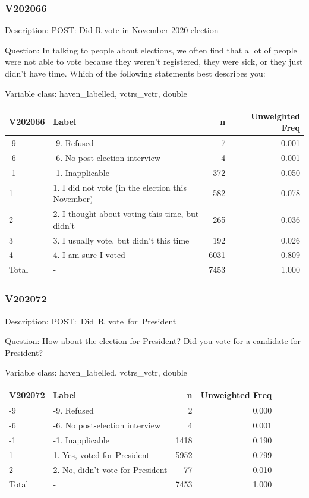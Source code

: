 \documentclass[
]{krantz}
\begin{document}
\hypertarget{v202066}{%
\subsubsection*{V202066}\label{v202066}}


Description: POST: Did R vote in November 2020 election

Question: In talking to people about elections, we often find that a lot of people were not able to vote because they weren't registered, they were sick, or they just didn't have time. Which of the following statements best describes you:

Variable class: haven\_labelled, vctrs\_vctr, double

\begin{tabular}[t]{l|l|r|r}
\hline
V202066 & Label & n & Unweighted Freq\\
\hline
-9 & -9. Refused & 7 & 0.001\\
\hline
-6 & -6. No post-election interview & 4 & 0.001\\
\hline
-1 & -1. Inapplicable & 372 & 0.050\\
\hline
1 & 1. I did not vote (in the election this November) & 582 & 0.078\\
\hline
2 & 2. I thought about voting this time, but didn't & 265 & 0.036\\
\hline
3 & 3. I usually vote, but didn't this time & 192 & 0.026\\
\hline
4 & 4. I am sure I voted & 6031 & 0.809\\
\hline
Total & - & 7453 & 1.000\\
\hline
\end{tabular}

\hypertarget{v202072}{%
\subsubsection*{V202072}\label{v202072}}


Description: POST:~Did~R~vote~for~President

Question: How about the election for President? Did you vote for a candidate for President?

Variable class: haven\_labelled, vctrs\_vctr, double

\begin{tabular}[t]{l|l|r|r}
\hline
V202072 & Label & n & Unweighted Freq\\
\hline
-9 & -9. Refused & 2 & 0.000\\
\hline
-6 & -6. No post-election interview & 4 & 0.001\\
\hline
-1 & -1. Inapplicable & 1418 & 0.190\\
\hline
1 & 1. Yes, voted for President & 5952 & 0.799\\
\hline
2 & 2. No, didn't vote for President & 77 & 0.010\\
\hline
Total & - & 7453 & 1.000\\
\hline
\end{tabular}
\end{document}
